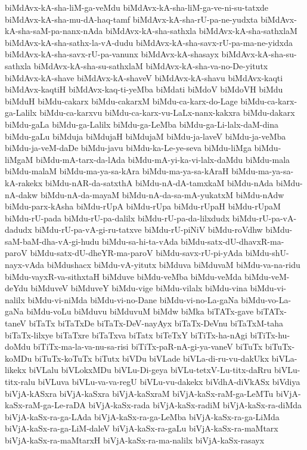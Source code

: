 {biMdAvx-kA-sha-liM-ga-veMdu
biMdAvx-kA-sha-liM-ga-ve-ni-su-tatxde
biMdAvx-kA-sha-mu-dA-haq-tamf
biMdAvx-kA-sha-rU-pa-ne-yudxta
biMdAvx-kA-sha-saM-pa-nanx-nAda
biMdAvx-kA-sha-sathxla
biMdAvx-kA-sha-sathxlaM
biMdAvx-kA-sha-sathx-la-vA-dudu
biMdAvx-kA-sha-savx-rU-pa-ma-ne-yidxda
biMdAvx-kA-sha-savx-rU-pa-vanunx
biMdAvx-kA-shasayx
biMdAvx-kA-sha-su-sathxla
biMdAvx-kA-sha-su-sathxlaM
biMdAvx-kA-sha-va-no-De-yitutx
biMdAvx-kA-shave
biMdAvx-kA-shaveV
biMdAvx-kA-shavu
biMdAvx-kaqti
biMdAvx-kaqtiH
biMdAvx-kaq-ti-yeMba
biMdati
biMdoV
biMdoVH
biMdu
biMduH
biMdu-cakarx
biMdu-cakarxM
biMdu-ca-karx-do-Lage
biMdu-ca-karx-ga-Lalilx
biMdu-ca-karxvu
biMdu-ca-karx-vu-LaLx-nanx-kakxra
biMdu-dakarx
biMdu-gaLa
biMdu-ga-Lalilx
biMdu-ga-LeMba
biMdu-ga-Li-lalx-daM-dina
biMdu-gaLu
biMduja
biMdujaH
biMdujaM
biMdu-ja-laveV
biMdu-ja-veMba
biMdu-ja-veM-daDe
biMdu-javu
biMdu-ka-Le-ye-seva
biMdu-liMga
biMdu-liMgaM
biMdu-mA-tarx-da-lAda
biMdu-mA-yi-ka-vi-lalx-daMdu
biMdu-mala
biMdu-malaM
biMdu-ma-ya-sa-kAra
biMdu-ma-ya-sa-kAraH
biMdu-ma-ya-sa-kA-rakekx
biMdu-nAR-da-satxthA
biMdu-nA-dA-tamxkaM
biMdu-nAda
biMdu-nA-dakw
biMdu-nA-da-mayaM
biMdu-nA-da-sa-mA-yukatxM
biMdu-nAdw
biMdu-parx-kAsha
biMdu-rUpA
biMdu-rUpa
biMdu-rUpaH
biMdu-rUpaM
biMdu-rU-pada
biMdu-rU-pa-dalilx
biMdu-rU-pa-da-lilxdudx
biMdu-rU-pa-vA-dadudx
biMdu-rU-pa-vA-gi-ru-tatxve
biMdu-rU-piNiV
biMdu-roVdhw
biMdu-saM-baM-dha-vA-gi-hudu
biMdu-sa-hi-ta-vAda
biMdu-satx-dU-dhavxR-ma-paroV
biMdu-satx-dU-dheYR-ma-paroV
biMdu-savx-rU-pi-yAda
biMdu-shU-nayx-vAda
biMdushacx
biMdu-vA-yitutx
biMduva
biMduvaM
biMdu-va-na-ridu
biMdu-vayxR-va-sithxtaH
biMduve
biMdu-veMba
biMdu-veMda
biMdu-veM-deYdu
biMduveV
biMduveY
biMdu-vige
biMdu-vilalx
biMdu-vina
biMdu-vi-nalilx
biMdu-vi-niMda
biMdu-vi-no-Dane
biMdu-vi-no-La-gaNa
biMdu-vo-La-gaNa
biMdu-voLu
biMduvu
biMduvuM
biMdw
biMka
biTATx-gave
biTATx-taneV
biTaTx
biTaTxDe
biTaTx-DeV-nayAyx
biTaTx-DeVnu
biTaTxM-taha
biTaTx-lilxye
biTaTxre
biTaTxva
biTatx
biTeTxY
biTiTx-ha-nAgi
biTiTx-hu-doMdu
biTiTx-ma-la-va-nu-sa-risi
biTiTx-paR-nA-gi-ya-vaneV
biTuTx
biTuTx-koMDu
biTuTx-koTuTx
biTutx
biVDu
biVLade
biVLa-di-ru-vu-dakUkx
biVLa-likekx
biVLalu
biVLokxMDu
biVLu-Di-geya
biVLu-tetxV-Lu-titx-daRru
biVLu-titx-ralu
biVLuva
biVLu-va-va-regU
biVLu-vu-dakekx
biVdhA-diVkASx
biVdiya
biVjA-kASxra
biVjA-kaSxra
biVjA-kaSxraM
biVjA-kaSx-raM-ga-LeMTu
biVjA-kaSx-raM-ga-Le-raDA
biVjA-kaSx-rada
biVjA-kaSx-radiM
biVjA-kaSx-ra-diMda
biVjA-kaSx-ra-ga-LAda
biVjA-kaSx-ra-ga-LeMba
biVjA-kaSx-ra-ga-LiMda
biVjA-kaSx-ra-ga-LiM-daleV
biVjA-kaSx-ra-gaLu
biVjA-kaSx-ra-maMtarx
biVjA-kaSx-ra-maMtarxH
biVjA-kaSx-ra-ma-nalilx
biVjA-kaSx-rasayx
}

